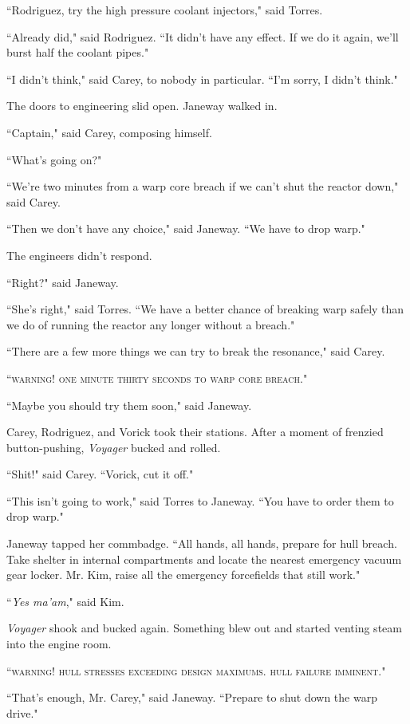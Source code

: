 \documentclass[twoside,letterpaper,12pt]{memoir}
\begin{document}
``Rodriguez, try the high pressure coolant injectors," said Torres.

``Already did," said Rodriguez. ``It didn't have any effect. If we do it again, we'll burst half the coolant pipes."

``I didn't think," said Carey, to nobody in particular. ``I'm sorry, I didn't think."

The doors to engineering slid open. Janeway walked in.

``Captain," said Carey, composing himself.

``What's going on?"

``We're two minutes from a warp core breach if we can't shut the reactor down," said Carey.

``Then we don't have any choice," said Janeway. ``We have to drop warp."

The engineers didn't respond.

``Right?" said Janeway.

``She's right," said Torres. ``We have a better chance of breaking warp safely than we do of running the reactor any longer without a breach."

``There are a few more things we can try to break the resonance," said Carey.

``\textsc{warning! one minute thirty seconds to warp core breach}."

``Maybe you should try them soon," said Janeway.

Carey, Rodriguez, and Vorick took their stations. After a moment of frenzied button-pushing, \textit{Voyager} bucked and rolled.

``Shit!" said Carey. ``Vorick, cut it off."

``This isn't going to work," said Torres to Janeway. ``You have to order them to drop warp."

Janeway tapped her commbadge. ``All hands, all hands, prepare for hull breach. Take shelter in internal compartments and locate the nearest emergency vacuum gear locker. Mr. Kim, raise all the emergency forcefields that still work."

``\textit{Yes ma'am}," said Kim.

\textit{Voyager} shook and bucked again. Something blew out and started venting steam into the engine room.

``\textsc{warning! hull stresses exceeding design maximums. hull failure imminent}."

``That's enough, Mr. Carey," said Janeway. ``Prepare to shut down the warp drive."
\end{document}
